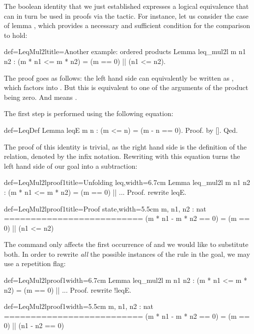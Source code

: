 The boolean identity  that we just established expresses a
logical equivalence that can in turn be used in proofs via the
 tactic. For instance, let us consider the case of lemma
, which provides a necessary and sufficient condition
for the comparison  to hold:

\begin{coq}{def=LeqMul2l}{title=Another example: ordered products}
Lemma leq_mul2l m n1 n2 : (m * n1 <= m * n2) = (m == 0) || (n1 <= n2).
\end{coq}

The proof goes as follows: the left
hand side can equivalently be written as , which
factors into . But this is equivalent to one
of the arguments of the product being zero. And 
means .

The first step is performed using the following equation:

\begin{coq}{def=LeqDef}{}
Lemma leqE m n : (m <= n) = (m - n == 0).
Proof. by []. Qed.
\end{coq}
The proof of this identity is trivial, as the right hand side is the
definition of the  relation, denoted by the \C{<=} infix
notation. Rewriting with this equation turns the left hand side of our
goal into a subtraction:

\begin{coq}{def=LeqMul2lproof1}{title=Unfolding leq,width=6.7cm}
Lemma leq_mul2l m n1 n2 :
 (m * n1 <= m * n2) = (m == 0) || ...
Proof.
rewrite leqE.
\end{coq}
\begin{coqout}{def=LeqMul2lproof1}{title=Proof state,width=5.5cm}
m, n1, n2 : nat
==========================
(m * n1 - m * n2 == 0) =
  (m == 0) || (n1 <= n2)
\end{coqout}

The command  only affects the first
occurrence of \C{<=} and we would like to substitute both. In order to
rewrite \emph{all} the possible instances of the rule in the goal, we
may use a repetition flag:

\begin{coq}{def=LeqMul2lproof1}{width=6.7cm}
Lemma leq_mul2l m n1 n2 :
 (m * n1 <= m * n2) = (m == 0) || ...
Proof.
rewrite !leqE.
\end{coq}
\begin{coqout}{def=LeqMul2lproof1}{width=5.5cm}
m, n1, n2 : nat
==========================
(m * n1 - m * n2 == 0) =
  (m == 0) || (n1 - n2 == 0)
\end{coqout}

